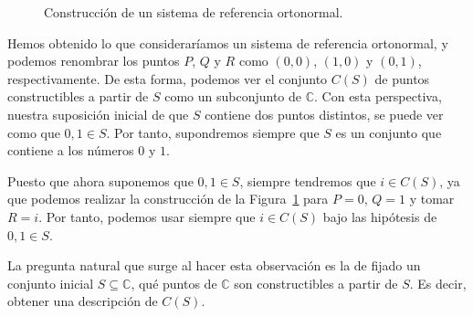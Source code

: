 \begin{figure}[h]
    \centering
    \caption{Construcción de un sistema de referencia ortonormal.}
    \label{fig:construccion_ortonormal}
\end{figure}



Hemos obtenido lo que consideraríamos un sistema de referencia ortonormal, y podemos renombrar los puntos $P$, $Q$ y $R$ como $(0,0)$, $(1,0)$ y $(0,1)$, respectivamente. De esta forma, podemos ver el conjunto $C(S)$ de puntos constructibles a partir de $S$ como un subconjunto de $\mathbb{C}$. Con esta perspectiva, nuestra suposición inicial de que $S$ contiene dos puntos distintos, se puede ver como que $0,1\in S$. Por tanto, supondremos siempre que $S$ es un conjunto que contiene a los números $0$ y $1$.

\begin{observacion}
    Puesto que ahora suponemos que $0,1\in S$, siempre tendremos que $i \in C(S)$, ya que podemos realizar la construcción de la Figura~\ref{fig:construccion_ortonormal} para $P = 0$, $Q= 1$ y tomar $R = i$. Por tanto, podemos usar siempre que $i \in C(S)$ bajo las hipótesis de $0,1\in S$.
\end{observacion}

La pregunta natural que surge al hacer esta observación es la de fijado un conjunto inicial $S\subseteq \mathbb{C}$, qué puntos de $\mathbb{C}$ son constructibles a partir de $S$. Es decir, obtener una descripción de $C(S)$.

